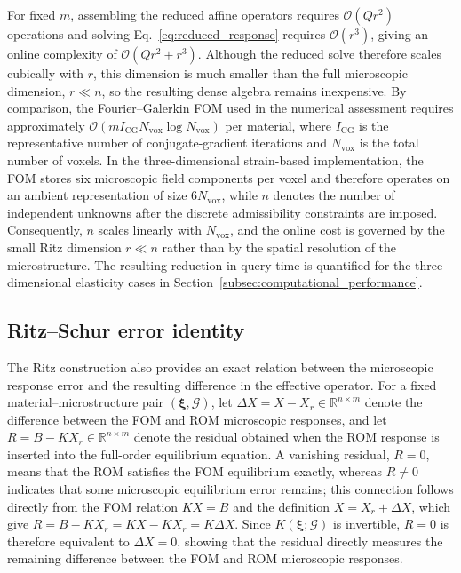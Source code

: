 \documentclass[pdflatex,sn-basic,Numbered]{sn-jnl}
\newcommand{\R}{\mathbb{R}}
\newcommand{\G}{\mathcal{G}}
\begin{document}
For fixed \(m\), assembling the reduced affine operators requires
\(\mathcal O(Qr^2)\) operations and solving
Eq.~\eqref{eq:reduced_response} requires
\(\mathcal O(r^3)\), giving an online complexity of
\(\mathcal O(Qr^2+r^3)\). Although the reduced solve therefore scales
cubically with \(r\), this dimension is much smaller than the full
microscopic dimension, \(r\ll n\), so the resulting dense algebra remains
inexpensive. By comparison, the Fourier--Galerkin FOM used in the numerical
assessment requires approximately
\(\mathcal O(mI_{\mathrm{CG}}N_{\mathrm{vox}}\log N_{\mathrm{vox}})\) per
material, where \(I_{\mathrm{CG}}\) is the representative number of
conjugate-gradient iterations and \(N_{\mathrm{vox}}\) is the total number
of voxels. In the three-dimensional strain-based implementation, the FOM
stores six microscopic field components per voxel and therefore operates on
an ambient representation of size \(6N_{\mathrm{vox}}\), while \(n\) denotes
the number of independent unknowns after the discrete admissibility constraints
are imposed. Consequently, \(n\) scales linearly with
\(N_{\mathrm{vox}}\), and the online cost is governed by the small Ritz
dimension \(r\ll n\) rather than by the spatial resolution of the
microstructure. The resulting reduction
in query time is quantified for the three-dimensional elasticity cases in
Section~\ref{subsec:computational_performance}.

\subsection{Ritz--Schur error identity}
\label{subsec:ritz_schur_identity}

The Ritz construction also provides an exact relation between the microscopic
response error and the resulting difference in the effective operator. For a
fixed material--microstructure pair \((\boldsymbol\xi,\G)\), let
\(\Delta X=X-X_r\in\R^{n\times m}\) denote the difference between the FOM and
ROM microscopic responses, and let \(R=B-KX_r\in\R^{n\times m}\) denote the
residual obtained when the ROM response is inserted into the full-order
equilibrium equation. A vanishing residual, \(R=0\), means that the ROM
satisfies the FOM equilibrium exactly, whereas \(R\neq0\) indicates that some
microscopic equilibrium error remains; this connection follows directly from
the FOM relation \(KX=B\) and the definition
\(X=X_r+\Delta X\), which give
\(R=B-KX_r=KX-KX_r=K\Delta X\). Since
\(K(\boldsymbol\xi;\G)\) is invertible, \(R=0\) is therefore equivalent to
\(\Delta X=0\), showing that the residual directly measures the remaining
difference between the FOM and ROM microscopic responses.
\end{document}
